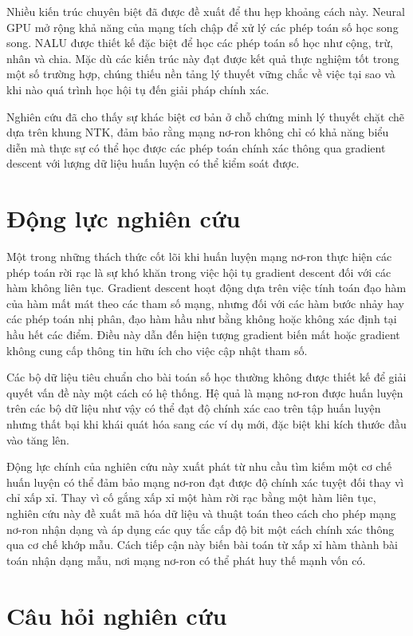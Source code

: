 Nhiều kiến trúc chuyên biệt đã được đề xuất để thu hẹp khoảng cách này. Neural GPU mở rộng khả năng của mạng tích chập để xử lý các phép toán số học song song. NALU được thiết kế đặc biệt để học các phép toán số học như cộng, trừ, nhân và chia. Mặc dù các kiến trúc này đạt được kết quả thực nghiệm tốt trong một số trường hợp, chúng thiếu nền tảng lý thuyết vững chắc về việc tại sao và khi nào quá trình học hội tụ đến giải pháp chính xác.

Nghiên cứu đã cho thấy sự khác biệt cơ bản ở chỗ chứng minh lý thuyết chặt chẽ dựa trên khung NTK, đảm bảo rằng mạng nơ-ron không chỉ có khả năng biểu diễn mà thực sự có thể học được các phép toán chính xác thông qua gradient descent với lượng dữ liệu huấn luyện có thể kiểm soát được.

\section{Động lực nghiên cứu}

Một trong những thách thức cốt lõi khi huấn luyện mạng nơ-ron thực hiện các phép toán rời rạc là sự khó khăn trong việc hội tụ gradient descent đối với các hàm không liên tục. Gradient descent hoạt động dựa trên việc tính toán đạo hàm của hàm mất mát theo các tham số mạng, nhưng đối với các hàm bước nhảy hay các phép toán nhị phân, đạo hàm hầu như bằng không hoặc không xác định tại hầu hết các điểm. Điều này dẫn đến hiện tượng gradient biến mất hoặc gradient không cung cấp thông tin hữu ích cho việc cập nhật tham số.

Các bộ dữ liệu tiêu chuẩn cho bài toán số học thường không được thiết kế để giải quyết vấn đề này một cách có hệ thống. Hệ quả là mạng nơ-ron được huấn luyện trên các bộ dữ liệu như vậy có thể đạt độ chính xác cao trên tập huấn luyện nhưng thất bại khi khái quát hóa sang các ví dụ mới, đặc biệt khi kích thước đầu vào tăng lên.

Động lực chính của nghiên cứu này xuất phát từ nhu cầu tìm kiếm một cơ chế huấn luyện có thể đảm bảo mạng nơ-ron đạt được độ chính xác tuyệt đối thay vì chỉ xấp xỉ. Thay vì cố gắng xấp xỉ một hàm rời rạc bằng một hàm liên tục, nghiên cứu này đề xuất mã hóa dữ liệu và thuật toán theo cách cho phép mạng nơ-ron nhận dạng và áp dụng các quy tắc cấp độ bit một cách chính xác thông qua cơ chế khớp mẫu. Cách tiếp cận này biến bài toán từ xấp xỉ hàm thành bài toán nhận dạng mẫu, nơi mạng nơ-ron có thể phát huy thế mạnh vốn có.

\section{Câu hỏi nghiên cứu}

